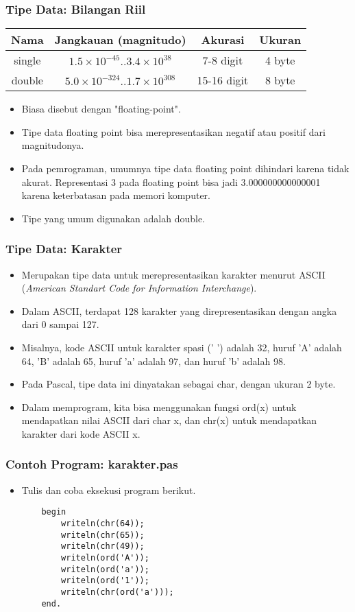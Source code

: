 \documentclass{beamer}
\begin{document}
\begin{frame}
\frametitle{Tipe Data: Bilangan Riil}
\begin{tabular}{|c|c|c|c|}
	\hline Nama  & Jangkauan (magnitudo) & Akurasi & Ukuran \\ 
	\hline single & $1.5\times10^{-45} .. 3.4\times10^{38}$ & 7-8 digit & 4 byte\\ 
	\hline double & $5.0\times10^{-324} .. 1.7\times10^{308}$ & 15-16 digit & 8 byte \\ 
	\hline 
\end{tabular} 
\begin{itemize}
	\item Biasa disebut dengan "floating-point".
	\item Tipe data floating point bisa merepresentasikan negatif atau positif dari magnitudonya.
	\item Pada pemrograman, umumnya tipe data floating point dihindari karena tidak akurat. Representasi 3 pada floating point bisa jadi 3.000000000000001 karena keterbatasan pada memori komputer.
	\item Tipe yang umum digunakan adalah double.
\end{itemize}
\end{frame}

\begin{frame}
\frametitle{Tipe Data: Karakter}
\begin{itemize}
	\item Merupakan tipe data untuk merepresentasikan karakter menurut ASCII (\textit{American Standart Code for Information Interchange}).
	\item Dalam ASCII, terdapat 128 karakter yang direpresentasikan dengan angka dari 0 sampai 127. 
	\item Misalnya, kode ASCII untuk karakter spasi (' ') adalah 32, huruf 'A' adalah 64, 'B' adalah 65, huruf 'a' adalah 97, dan huruf 'b' adalah 98.
	\item Pada Pascal, tipe data ini dinyatakan sebagai \alert{char}, dengan ukuran 2 byte.
	\item Dalam memprogram, kita bisa menggunakan fungsi ord(x) untuk mendapatkan nilai ASCII dari char x, dan chr(x) untuk mendapatkan karakter dari kode ASCII x.
\end{itemize}
\end{frame}

\begin{frame}[fragile]
\frametitle{Contoh Program: karakter.pas}
\begin{itemize}
	\item Tulis dan coba eksekusi program berikut.
	\begin{lstlisting}
	begin
	    writeln(chr(64));
	    writeln(chr(65));
	    writeln(chr(49));
	    writeln(ord('A'));
	    writeln(ord('a'));
	    writeln(ord('1'));
	    writeln(chr(ord('a')));
	end.
	\end{lstlisting}
\end{itemize}
\end{frame}
\end{document}
